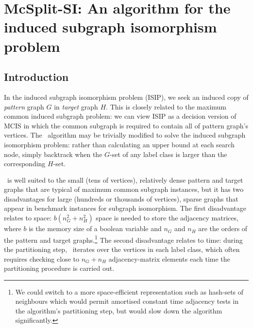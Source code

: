 
\newcommand{\varStartG}{\ensuremath{\AlgVar{start}_G}}
\newcommand{\varEndG}{\ensuremath{\AlgVar{end}_G}}
\newcommand{\varStartH}{\ensuremath{\AlgVar{start}_H}}
\newcommand{\varEndH}{\ensuremath{\AlgVar{end}_H}}
\newcommand{\varActive}{\ensuremath{\AlgVar{active}}}
\newcommand{\varSplitting}{\ensuremath{\AlgVar{splitting}}}
\newcommand{\varPrev}{\ensuremath{\AlgVar{prev}}}
\newcommand{\varNext}{\ensuremath{\AlgVar{next}}}
\newcommand{\labelClass}{\ensuremath{\AlgVar{labelClass}}}
\newcommand{\vertexPtr}{\ensuremath{\AlgVar{vertexPtr}}}
\newcommand{\calLC}{\ensuremath{\mathcal{LC}}}
\newcommand{\LC}{\ensuremath{\AlgVar{LC}}}
\newcommand{\Gptrs}{\ensuremath{P_G}}
\newcommand{\Hptrs}{\ensuremath{P_H}}
\newcommand{\Garray}{\ensuremath{A_G}}
\newcommand{\Harray}{\ensuremath{A_H}}

\chapter{McSplit-SI: An algorithm for the induced subgraph isomorphism problem}
\label{c:mcsplit-si}

\section{Introduction}

In the induced subgraph isomorphism problem (ISIP), we seek an induced copy of \emph{pattern} graph $G$ in \emph{target} graph $H$. This is closely related to the maximum common induced subgraph problem: we can view ISIP as a decision version of MCIS in which the common subgraph is required to contain all of pattern graph's vertices.
The \McSplit\ algorithm may be trivially modified to solve the induced subgraph isomorphism problem: rather than calculating an upper bound at each search node, simply backtrack when the $G$-set of any label class is larger than the corresponding $H$-set.

\McSplit\ is well suited to the small (tens of vertices), relatively dense pattern and target graphs that are typical of maximum common subgraph instances, but it has two disadvantages for large (hundreds or thousands of vertices), sparse graphs that appear in benchmark instances for subgraph isomorphism.  The first disadvantage relates to space: $b(n_G^2 + n_H^2)$ space is needed to store the adjacency matrices, where $b$ is the memory size of a boolean variable and $n_G$ and $n_H$ are the orders of the pattern and target graphs.\footnote{We could switch to a more space-efficient representation such as hash-sets of neighbours which would permit amortised constant time adjacency tests in the algorithm's partitioning step, but would slow down the algorithm significantly.}  The second disadvantage relates to time: during the partitioning step, \McSplit\ iterates over the vertices in each label class, which often requires checking close to $n_G + n_H$ adjacency-matrix elements each time the partitioning procedure is carried out.

